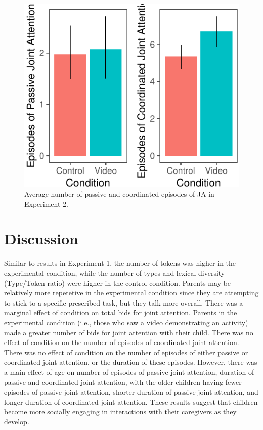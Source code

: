 \documentclass[10pt, letterpaper]{article}
\newenvironment{CodeChunk}{}{}
\begin{document}
\begin{CodeChunk}
\begin{figure}[H]

{\centering \includegraphics{figs/e2ja-graphs-pass-coord-1} 

}

\caption[Average number of passive and coordinated episodes of JA in Experiment 2]{Average number of passive and coordinated episodes of JA in Experiment 2.}\label{fig:e2ja-graphs-pass-coord}
\end{figure}
\end{CodeChunk}

\section{Discussion}\label{discussion-1}

Similar to results in Experiment 1, the number of tokens was higher in
the experimental condition, while the number of types and lexical
diversity (Type/Token ratio) were higher in the control condition.
Parents may be relatively more repetetive in the experimental condition
since they are attempting to stick to a specific prescribed task, but
they talk more overall. There was a marginal effect of condition on
total bids for joint attention. Parents in the experimental condition
(i.e., those who saw a video demonstrating an activity) made a greater
number of bids for joint attention with their child. There was no effect
of condition on the number of episodes of coordinated joint attention.
There was no effect of condition on the number of episodes of either
passive or coordinated joint attention, or the duration of these
episodes. However, there was a main effect of age on number of episodes
of passive joint attention, duration of passive and coordinated joint
attention, with the older children having fewer episodes of passive
joint attention, shorter duration of passive joint attention, and longer
duration of coordinated joint attention. These results suggest that
children become more socially engaging in interactions with their
caregivers as they develop.
\end{document}
